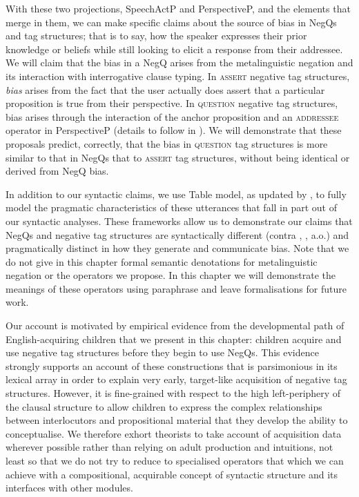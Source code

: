 \documentclass[output=paper,colorlinks,citecolor=brown]{langscibook}
\begin{document}
With these two projections, SpeechActP and PerspectiveP, and the elements that merge in them, we can make specific claims about the source of bias in NegQs and tag structures; that is to say, how the speaker expresses their prior knowledge or beliefs while still looking to elicit a response from their addressee. We will claim that the bias in a NegQ arises from the metalinguistic negation and its interaction with interrogative clause typing. In \textsc{assert} negative tag structures, \textit{bias} arises from the fact that the user actually does assert that a particular proposition is true from their perspective. In \textsc{question} negative tag structures, bias arises through the interaction of the anchor proposition and an \textsc{addressee} operator in PerspectiveP (details to follow in ). We will demonstrate that these proposals predict, correctly, that the bias in \textsc{question} tag structures is more similar to that in NegQs that to \textsc{assert} tag structures, without being identical or derived from NegQ bias.

In addition to our syntactic claims, we use  Table model, as updated by \citet{farkas2022}, to fully model the pragmatic characteristics of these utterances that fall in part out of our syntactic analyses. These frameworks allow us to demonstrate our claims that NegQs and negative tag structures are syntactically different (contra \citealt{sailor2012}, \citealt{jamieson2018}, a.o.) and pragmatically distinct in how they generate and communicate bias. Note that we do not give in this chapter formal semantic denotations for metalinguistic negation or the operators we propose. In this chapter we will demonstrate the meanings of these operators using paraphrase and leave formalisations for future work.

Our account is motivated by empirical evidence from the developmental path of English-acquiring children that we present in this chapter: children acquire and use negative tag structures before they begin to use NegQs. This evidence strongly supports an account of these constructions that is parsimonious in its lexical array in order to explain very early, target-like acquisition of negative tag structures. However, it is fine-grained with respect to the high left-periphery of the clausal structure to allow children to express the complex relationships between interlocutors and propositional material that they develop the ability to conceptualise. We therefore exhort theorists to take account of acquisition data wherever possible rather than relying on adult production and intuitions, not least so that we do not try to reduce to specialised operators that which we can achieve with a compositional, acquirable concept of syntactic structure and its interfaces with other modules.
\end{document}
